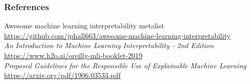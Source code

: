 \documentclass[11pt,
               aspectratio=169,
               hyperref={colorlinks}
               ]{beamer}
\begin{document}
	\begin{frame}
	
		\frametitle{References}	
		
		\normalsize{Awesome machine learning interpretability metalist}\\
		\scriptsize{\url{https://github.com/jphall663/awesome-machine-learning-interpretability}}\\
		\vspace{10pt}
		\normalsize{\textit{An Introduction to Machine Learning Interpretability - 2nd Edition}}\\
		\scriptsize{\url{https://www.h2o.ai/oreilly-mli-booklet-2019}}\\
		\vspace{10pt}
		\normalsize{\textit{Proposed Guidelines for the Responsible Use of Explainable Machine Learning}}\\
		\scriptsize{\url{https://arxiv.org/pdf/1906.03533.pdf}}
								
	
		
	\end{frame}
\end{document}
